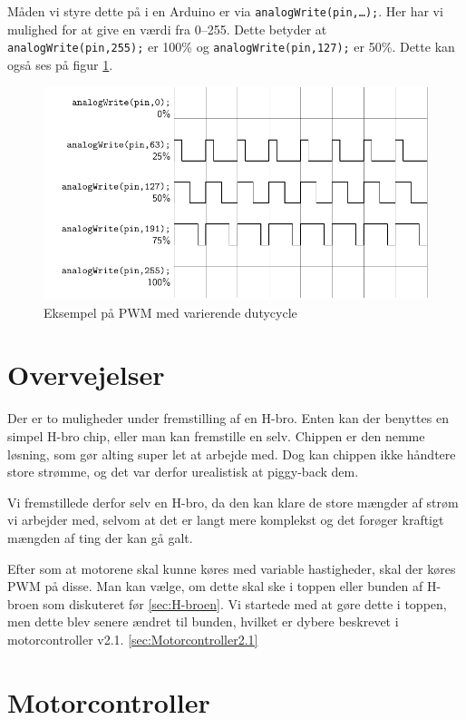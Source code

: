 \documentclass[a4paper,oneside,article,danish,table]{memoir}
\begin{document}
Måden vi styre dette på i en Arduino er via \texttt{analogWrite(pin,\dots);}. Her har vi mulighed for at give en værdi fra 0--255. Dette betyder at \texttt{analogWrite(pin,255);} er 100\% og \texttt{analogWrite(pin,127);} er 50\%. Dette kan også ses på figur \ref{fig:pwm}.
\begin{figure}[htbp]
  \centering
  \includegraphics[width=\textwidth]{pictures/pwm.pdf}
  \caption{Eksempel på PWM med varierende dutycycle}
  \label{fig:pwm}
\end{figure}

\section{Overvejelser}
Der er to muligheder under fremstilling af en H-bro. Enten kan der benyttes en simpel H-bro chip, eller man kan fremstille en selv. Chippen er den nemme løsning, som gør alting super let at arbejde med. Dog kan chippen ikke håndtere store strømme, og det var derfor urealistisk at piggy-back dem.

Vi fremstillede derfor selv en H-bro, da den kan klare de store mængder af strøm vi arbejder med, selvom at det er langt mere komplekst og det forøger kraftigt mængden af ting der kan gå galt.

Efter som at motorene skal kunne køres med variable hastigheder, skal der køres PWM på disse. Man kan vælge, om dette skal ske i toppen eller bunden af H-broen som diskuteret før \ref{sec:H-broen}. Vi startede med at gøre dette i toppen, men dette blev senere ændret til bunden, hvilket er dybere beskrevet i motorcontroller v2.1. \ref{sec:Motorcontroller2.1}
\section{Motorcontroller}
\end{document}
